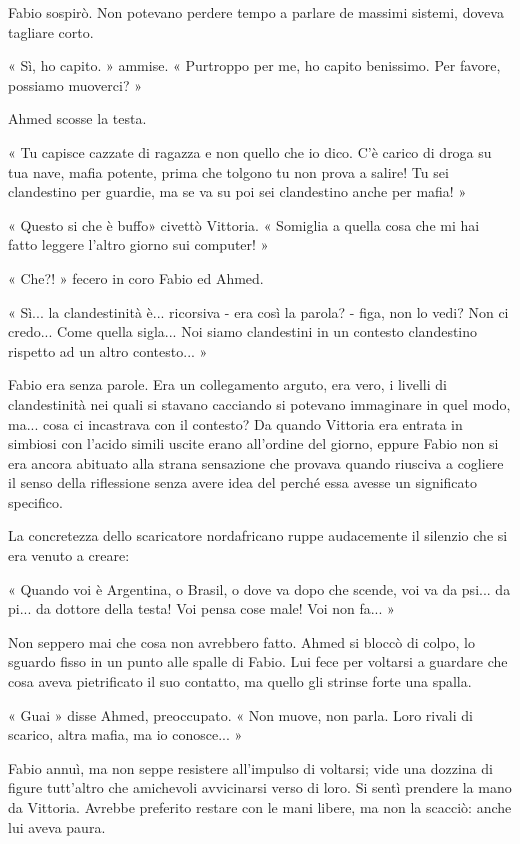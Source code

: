 Fabio sospirò. Non potevano perdere tempo a parlare de massimi sistemi, doveva tagliare corto.

« Sì, ho capito. » ammise. « Purtroppo per me, ho capito benissimo. Per favore, possiamo muoverci? »

Ahmed scosse la testa.

« Tu capisce cazzate di ragazza e non quello che io dico. C'è carico di droga su tua nave, mafia potente, prima che tolgono tu non prova a salire! Tu sei clandestino per guardie, ma se va su poi sei clandestino anche per mafia! »

« Questo si che è buffo» civettò Vittoria. « Somiglia a quella cosa che mi hai fatto leggere l'altro giorno sui computer! »

« Che?! » fecero in coro Fabio ed Ahmed.

« Sì... la clandestinità è... ricorsiva - era così la parola? - figa, non lo vedi? Non ci credo... Come quella sigla... Noi siamo clandestini in un contesto clandestino rispetto ad un altro contesto... »

Fabio era senza parole. Era un collegamento arguto, era vero, i livelli di clandestinità nei quali si stavano cacciando si potevano immaginare in quel modo, ma... cosa ci incastrava con il contesto? Da quando Vittoria era entrata in simbiosi con l'acido simili uscite erano all'ordine del giorno, eppure Fabio non si era ancora abituato alla strana sensazione che provava quando riusciva a cogliere il senso della riflessione senza avere idea del perché essa avesse un significato specifico.

La concretezza dello scaricatore nordafricano ruppe audacemente il silenzio che si era venuto a creare:

« Quando voi è Argentina, o Brasil, o dove va dopo che scende, voi va da psi... da pi... da dottore della testa! Voi pensa cose male! Voi non fa... »

Non seppero mai che cosa non avrebbero fatto. Ahmed si bloccò di colpo, lo sguardo fisso in un punto alle spalle di Fabio. Lui fece per voltarsi a guardare che cosa aveva pietrificato il suo contatto, ma quello gli strinse forte una spalla.

« Guai » disse Ahmed, preoccupato. « Non muove, non parla. Loro rivali di scarico, altra mafia, ma io conosce... »

Fabio annuì, ma non seppe resistere all'impulso di voltarsi; vide una dozzina di figure tutt'altro che amichevoli avvicinarsi verso di loro. Si sentì prendere la mano da Vittoria. Avrebbe preferito restare con le mani libere, ma non la scacciò: anche lui aveva paura.

